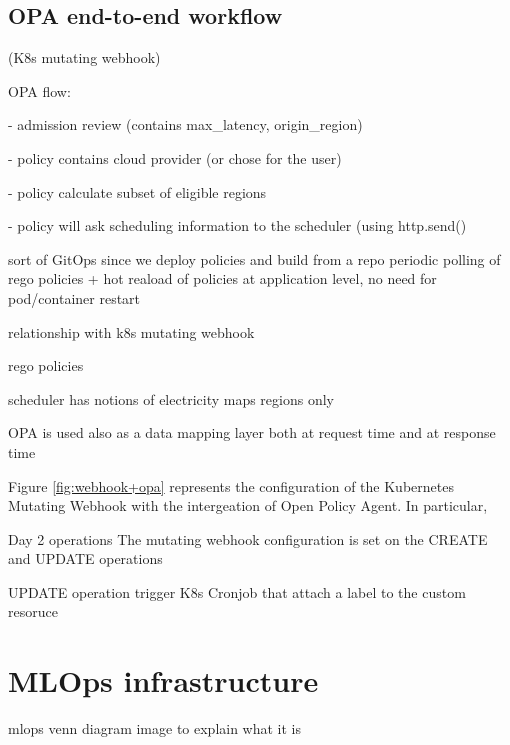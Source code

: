 \subsection{OPA end-to-end workflow}

 (K8s mutating webhook)

OPA flow:

- admission review (contains max\_latency, origin\_region)

- policy contains cloud provider (or chose for the user)

- policy calculate subset of eligible regions

- policy will ask scheduling information to the scheduler (using http.send()




sort of GitOps since we deploy policies and build from a repo
periodic polling of rego policies
+ hot reaload of policies at application level, no need for pod/container restart



relationship with k8s mutating webhook

rego policies


scheduler has notions of 
electricity maps regions only

OPA is used also as a data mapping layer
both at request time
and at response time



Figure \ref{fig:webhook+opa} represents the configuration of the Kubernetes Mutating Webhook with the intergeation of Open Policy Agent.
In particular, 




Day 2 operations
The mutating webhook configuration is set on the CREATE and UPDATE operations

UPDATE operation trigger
K8s Cronjob that attach a label to the custom resoruce 

\newpage


\section{MLOps infrastructure}

mlops venn diagram image
to explain what it is

